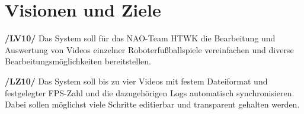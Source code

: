 \chapter{Visionen und Ziele}
\textbf{/LV10/} Das System soll für das NAO-Team HTWK die Bearbeitung und Auswertung von Videos einzelner Roboterfußballspiele vereinfachen und diverse Bearbeitungsmöglichkeiten bereitstellen.

\textbf{/LZ10/} Das System soll bis zu vier Videos mit festem Dateiformat und festgelegter FPS-Zahl und die dazugehörigen Logs automatisch synchronisieren. Dabei sollen möglichst viele Schritte editierbar und transparent gehalten werden.
